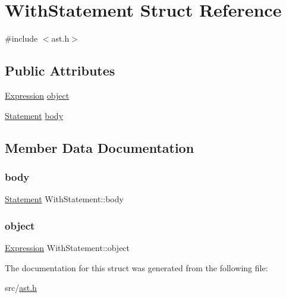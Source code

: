 \hypertarget{struct_with_statement}{}\section{With\+Statement Struct Reference}
\label{struct_with_statement}


{\ttfamily \#include $<$ast.\+h$>$}

\subsection*{Public Attributes}
\begin{DoxyCompactItemize}
\item 
\hyperlink{ast_8h_a4cb273a4d960cd13ea17d08f254493e8}{Expression} \hyperlink{struct_with_statement_ad6a507585cf0f9765587ac41f83f4acd}{object}
\item 
\hyperlink{ast_8h_a8b6ddf3732a0acd77e6b2509fb21a5fd}{Statement} \hyperlink{struct_with_statement_a38aa21cb112d29a9c4a7922c96c9d4ee}{body}
\end{DoxyCompactItemize}


\subsection{Member Data Documentation}
\mbox{\label{struct_with_statement_a38aa21cb112d29a9c4a7922c96c9d4ee}} 
\subsubsection{\texorpdfstring{body}{body}}
{\footnotesize\ttfamily \hyperlink{ast_8h_a8b6ddf3732a0acd77e6b2509fb21a5fd}{Statement} With\+Statement\+::body}

\mbox{\label{struct_with_statement_ad6a507585cf0f9765587ac41f83f4acd}} 
\subsubsection{\texorpdfstring{object}{object}}
{\footnotesize\ttfamily \hyperlink{ast_8h_a4cb273a4d960cd13ea17d08f254493e8}{Expression} With\+Statement\+::object}



The documentation for this struct was generated from the following file\+:\begin{DoxyCompactItemize}
\item 
src/\hyperlink{ast_8h}{ast.\+h}\end{DoxyCompactItemize}
